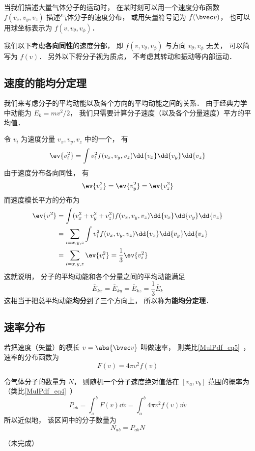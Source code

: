
\begin{issues}
\issueTODO
\end{issues}

当我们描述大量气体分子的运动时， 在某时刻可以用一个速度分布函数 $f(v_x, v_y, v_z)$ 描述气体分子的速度分布， 或用矢量符号记为 $f(\bvec v)$， 也可以用球坐标表示为 $f(v, v_\theta, v_\phi)$．

我们以下考虑\textbf{各向同性}的速度分部， 即 $f(v, v_\theta, v_\phi)$ 与方向 $v_\theta, v_\phi$ 无关， 可以简写为 $f(v)$． 另外以下将分子视为质点， 不考虑其转动和振动等内部运动．

\subsection{速度的能均分定理}
我们来考虑分子的平均动能以及各个方向的平均动能之间的关系． 由于经典力学中动能为 $E_k = mv^2/2$， 我们只需要计算分子速度（以及各个分量速度）平方的平均值．

令 $v_i$ 为速度分量 $v_x, v_y, v_z$ 中的一个， 有
\begin{equation}
\ev{v_i^2} = \int v_i^2 f(v_x, v_y, v_z) \dd{v_x}\dd{v_y}\dd{v_z}
\end{equation}
由于速度分布各向同性， 有
\begin{equation}
\ev{v_x^2} = \ev{v_y^2} = \ev{v_z^2}
\end{equation}
而速度模长平方的分布为
\begin{equation}
\begin{aligned}
\ev{v^2} &= \int (v_x^2 + v_y^2 + v_z^2) f(v_x, v_y, v_z) \dd{v_x}\dd{v_y}\dd{v_z}\\
&= \sum_{i = x,y,z} \int v_i^2 f(v_x, v_y, v_z) \dd{v_x}\dd{v_y}\dd{v_z}\\
&= \sum_{i = x,y,z} \ev{v_i^2} = \frac{1}{3} \ev{v_i^2}
\end{aligned}
\end{equation}
这就说明， 分子的平均动能和各个分量之间的平均动能满足
\begin{equation}\label{VelPdf_eq1}
\bar E_{kx} = \bar E_{ky} = \bar E_{kz} = \frac{1}{3} \bar E_k
\end{equation}
这相当于把总平均动能\textbf{均分}到了三个方向上， 所以称为\textbf{能均分定理}．

\subsection{速率分布}
若把速度（矢量）的模长 $v = \abs{\bvec v}$ 叫做速率， 则类比\autoref{MulPdf_eq5}~， 速率的分布函数为
\begin{equation}
F(v) = 4\pi v^2 f(v)
\end{equation}

令气体分子的数量为 $N$， 则随机一个分子速度绝对值落在 $[v_a, v_b]$ 范围的概率为（类比\autoref{MulPdf_eq4}~）
\begin{equation}
P_{ab} = \int_a^b F(v) \dd{v} = \int_a^b 4\pi v^2 f(v) \dd{v}
\end{equation}
所以近似地， 该区间中的分子数量为
\begin{equation}
N_{ab} = P_{ab} N
\end{equation}

（未完成）